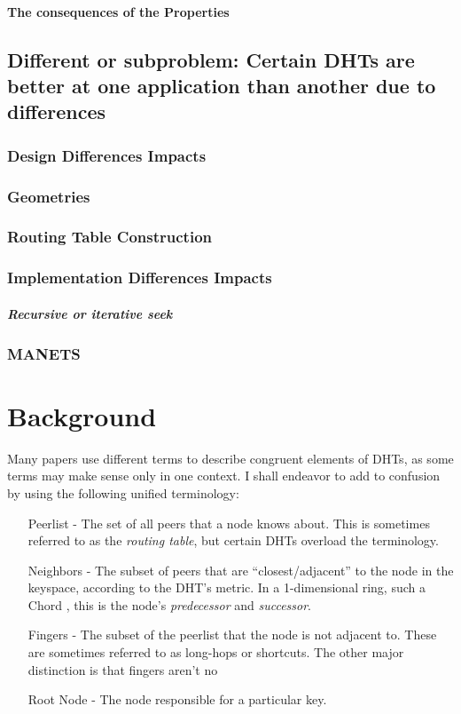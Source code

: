 \documentclass[10pt,letterpaper]{report}
\begin{document}
\subsubsection{The consequences of the Properties}


\section{Different or subproblem: Certain DHTs are better at one application than another due to differences}
\subsection{Design Differences Impacts}
\subsection{Geometries}
\subsection{Routing Table Construction}
\subsection{Implementation Differences Impacts}
\paragraph{Recursive or iterative seek}


\subsection{MANETS}


\chapter{Background}

Many papers use different terms to describe congruent elements of DHTs, as some terms may make sense only in one context.
I shall endeavor to add to confusion by using the following unified terminology:
\begin{enumerate}
	\item[Peerlist] -  The set of all peers that a node knows about.  This is sometimes referred to as the \textit{routing table}, but certain DHTs \cite{tapestry} \cite{pastry} overload the terminology.
	\item[Neighbors] - The subset of peers that are ``closest/adjacent'' to the node in the keyspace, according to the DHT's metric.  In a 1-dimensional ring, such a Chord \cite{chord}, this is the node's \textit{predecessor} and \textit{successor}.
	\item[Fingers] - The subset of the peerlist that the node is not adjacent to.  These are sometimes referred to as long-hops or shortcuts. The other major distinction is that fingers aren't no
	\item[Root Node] - The node responsible for a particular key. 
\end{enumerate}
\end{document}
